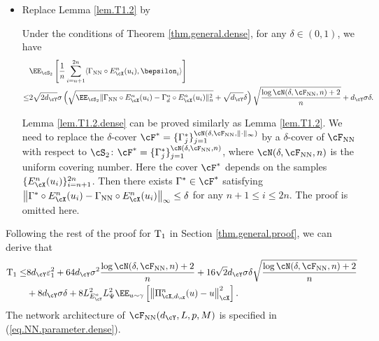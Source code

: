 \documentclass[11pt]{article} %
\begin{document}
\begin{itemize}
	\item Replace Lemma \ref{lem.T1.2} by
	\begin{lemma}\label{lem.T1.2.dense}
		Under the conditions of Theorem \ref{thm.general.dense}, for any $\delta\in (0,1)$, we have 
		\begin{align}
			&\EE_{\cS_2}\left[\frac{1}{n}\sum_{i=n+1}^{2n}\langle \Gamma_{\rm NN} \circ E_{\cX}^n(u_i), \bepsilon_i\rangle\right] \nonumber\\
			\leq & 2\sqrt{2d_{\cY}}\sigma\left(\sqrt{\EE_{\cS_2}\|\Gamma_{\rm NN} \circ E_{\cX}^n(u_i)-\Gamma_{d}^n \circ E_{\cX}^n(u_i)\|_n^2}+\sqrt{d_{\cY}}\delta \right)\sqrt{\frac{\log \cN(\delta,\cF_{\rm NN}, n) +2}{n}} +d_{\cY}\sigma\delta.
			\label{eq.T1.5.dense}
		\end{align}
	\end{lemma}
	Lemma \ref{lem.T1.2.dense} can be proved similarly as Lemma \ref{lem.T1.2}. We need to replace the $\delta$-cover $\cF^*=\{\Gamma^*_j\}_{j=1}^{\cN(\delta,\cF_{\rm NN},\|\cdot\|_{\infty})}$ by a  $\delta$-cover of $\cF_{\rm NN}$ with respect to $\cS_2$: $\cF^*=\{\Gamma^*_j\}_{j=1}^{\cN(\delta,\cF_{\rm NN},n)}$, where $\cN(\delta,\cF_{\rm NN},n)$ is the uniform covering number. Here the cover $\cF^*$ depends on the samples $\{E^n_{\cX}(u_i)\}_{i=n+1}^{2n}$.  Then there exists $\Gamma^*\in \cF^*$ satisfying $\left\|\Gamma^*\circ E^n_{\cX}(u_i)-\Gamma_{\rm NN}\circ E^n_{\cX}(u_i)\right\|_{\infty}\leq \delta$ for any $n+1\leq i\leq 2n$. The proof is omitted here.
\end{itemize}
Following the rest of the proof for ${\rm T}_1$ in Section \ref{thm.general.proof}, we can derive that 
\begin{align}
	{\rm T_1}\leq& 8d_{\cY}\varepsilon_1^2+64d_{\cY}\sigma^2\frac{\log \cN(\delta,\cF_{\rm NN}, n) +2}{n} + 16\sqrt{2}d_{\cY}\sigma\delta \sqrt{\frac{\log \cN(\delta,\cF_{\rm NN}, n) +2}{n}}\nonumber\\& +8d_{\cY}\sigma\delta +8L_{E^n_{\cY}}^2L_{\Psi}^2\EE_{u\sim \gamma}\left[\left\| \Pi_{\cX,d_{\cX}}^n(u)- u\right\|_{\cX}^2\right].
	\label{eq.T1.dense}
\end{align}
The network architecture of $\cF_{\rm NN}(d_{\cY},L,p,M)$ is specified in (\ref{eq.NN.parameter.dense}).
\end{document}

